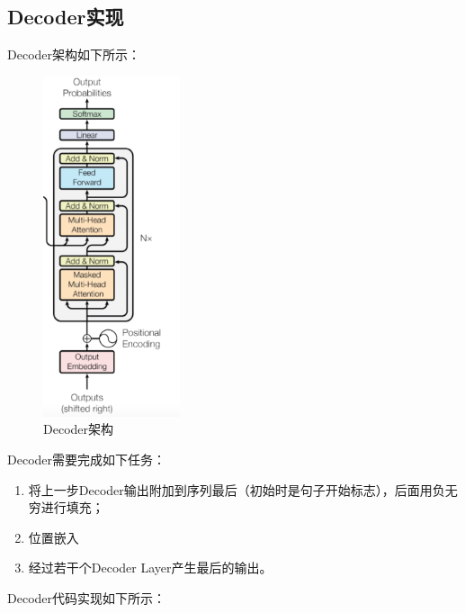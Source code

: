 \documentclass{article}
\begin{document}
\subsection{Decoder实现}
Decoder架构如下所示：
\begin{figure}[H]
    \caption{Decoder架构}
    \label{f000085}
    \centering
    \includegraphics[height=10cm]{images/f000085}
\end{figure}
Decoder需要完成如下任务：
\begin{enumerate}
\item 将上一步Decoder输出附加到序列最后（初始时是句子开始标志），后面用负无穷进行填充；
\item 位置嵌入
\item 经过若干个Decoder Layer产生最后的输出。
\end{enumerate}
Decoder代码实现如下所示：
\end{document}
